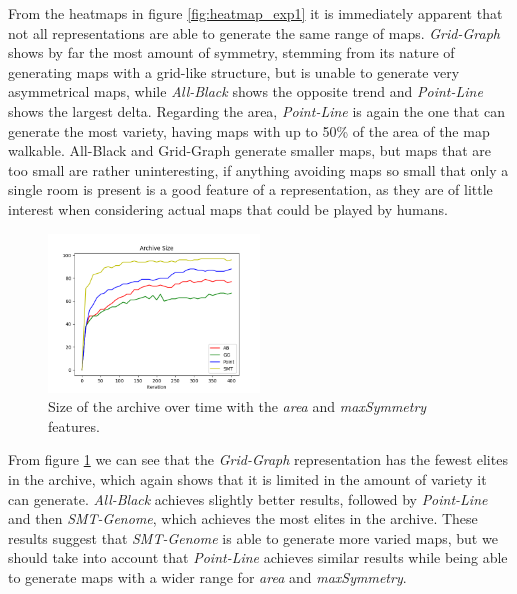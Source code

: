 From the heatmaps in figure \cref{fig:heatmap_exp1} it is immediately apparent that not all representations are able to generate the same range of maps. \textit{Grid-Graph} shows by far the most amount of symmetry, stemming from its nature of generating maps with a grid-like structure, but is unable to generate very asymmetrical maps, while \textit{All-Black} shows the opposite trend and \textit{Point-Line} shows the largest delta. Regarding the area, \textit{Point-Line} is again the one that can generate the most variety, having maps with up to 50\% of the area of the map walkable. All-Black and Grid-Graph generate smaller maps, but maps that are too small are rather uninteresting, if anything avoiding maps so small that only a single room is present is a good feature of a representation, as they are of little interest when considering actual maps that could be played by humans.

\begin{figure}[H]
    \centering
    \includegraphics[width=0.5\textwidth]{images/Exp1/archive_size.png}
    \caption{Size of the archive over time with the \textit{area} and \textit{maxSymmetry} features.}
    \label{fig:archive_size_exp1}
\end{figure} 

From figure \cref{fig:archive_size_exp1} we can see that the \textit{Grid-Graph} representation has the fewest elites in the archive, which again shows that it is limited in the amount of variety it can generate. \textit{All-Black} achieves slightly better results, followed by \textit{Point-Line} and then \textit{SMT-Genome}, which achieves the most elites in the archive. These results suggest that \textit{SMT-Genome} is able to generate more varied maps, but we should take into account that \textit{Point-Line} achieves similar results while being able to generate maps with a wider range for \textit{area} and \textit{maxSymmetry}.

